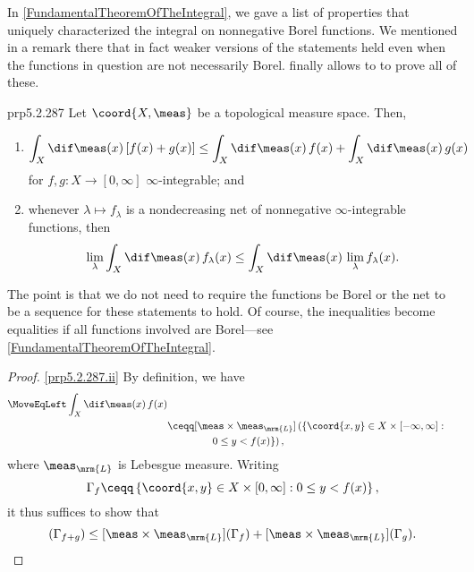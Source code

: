 In \cref{FundamentalTheoremOfTheIntegral}, we gave a list of properties that uniquely characterized the integral on nonnegative Borel functions.  We mentioned in a remark there that in fact weaker versions of the statements held even when the functions in question are not necessarily Borel.   finally allows to to prove all of these.
\begin{thm}{}{prp5.2.287}
Let $\coord{X,\meas}$ be a topological measure space.  Then,
\begin{enumerate}
\item \label{prp5.2.287.ii}
\begin{equation*}
\int _X\dif \meas (x)\, [f(x)+g(x)]\leq \int _X\dif \meas (x)\, f(x)+\int _X\dif \meas (x)\, g(x)
\end{equation*}
for $f,g\colon X\rightarrow [0,\infty ]$ $\infty$-integrable; and
\item \label{prp5.2.287.iv}whenever $\lambda \mapsto f_{\lambda}$ is a nondecreasing net of nonnegative $\infty$-integrable functions, then
\begin{equation}
\lim _{\lambda}\int _X\dif \meas (x)\, f_{\lambda}(x)\leq \int _X\dif \meas (x)\, \lim _{\lambda}f_{\lambda}(x).
\end{equation}
\end{enumerate}
\begin{rmk}
The point is that we do not need to require the functions be Borel or the net to be a sequence for these statements to hold.  Of course, the inequalities become equalities if all functions involved are Borel---see \cref{FundamentalTheoremOfTheIntegral}.
\end{rmk}
\begin{proof}
\cref{prp5.2.287.ii} By definition, we have
\begin{equation}
\begin{split}
\MoveEqLeft
\int _X\dif \meas (x)\, f(x) \\
& \ceqq [\meas \times \meas _{\mrm{L}}]\left( \left\{ \coord{x,y}\in X\times [-\infty ,\infty ]:\right. \right. \\ & \qquad \qquad \left. \left. 0\leq y<f(x)\right\} \right) ,
\end{split}
\end{equation}
where $\meas _{\mrm{L}}$ is Lebesgue measure.  Writing
\begin{equation}
\Gamma _f\ceqq \left\{ \coord{x,y}\in X\times [0,\infty ]:0\leq y<f(x)\right\} ,
\end{equation}
it thus suffices to show that
\begin{equation}
[\meas \times \meas _{\mrm{L}}](\Gamma _{f+g})\leq [\meas \times \meas _{\mrm{L}}](\Gamma _f)+[\meas \times \meas _{\mrm{L}}](\Gamma _g).
\end{equation}


\end{proof}
\end{thm}
